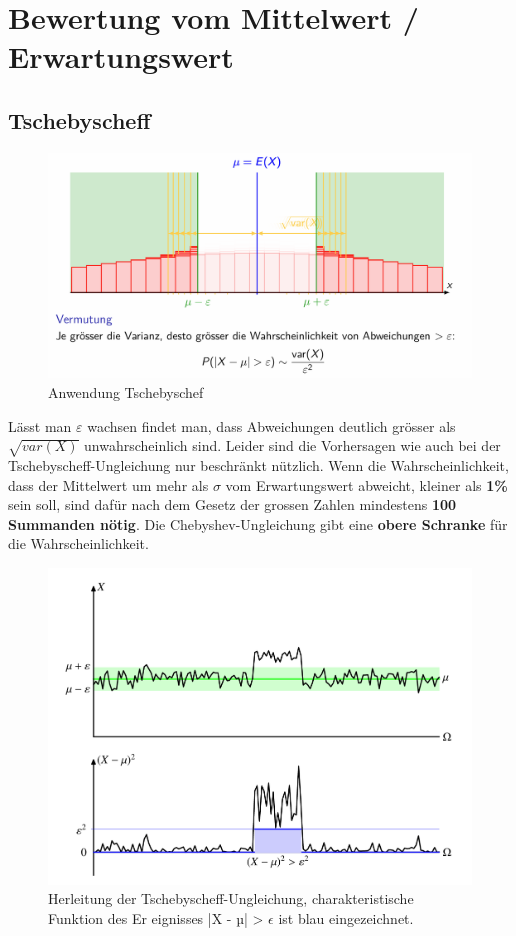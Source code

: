 \documentclass[../Main.tex]{subfiles}
\begin{document}
\section{Bewertung vom Mittelwert / Erwartungswert}

\subsection{Tschebyscheff}
\begin{figure}[H]
    \centering
    \includegraphics[width=0.75\linewidth]{Images/tschebyschef.png}
    \caption{Anwendung Tschebyschef}
\end{figure}

Lässt man \(\varepsilon\) wachsen findet man,
dass Abweichungen deutlich grösser als \(\sqrt{var(X)}\) unwahrscheinlich sind.  
Leider sind die Vorhersagen wie auch bei der
Tschebyscheff-Ungleichung nur beschränkt nützlich.
Wenn die Wahrscheinlichkeit, dass der Mittelwert um mehr
als \(\sigma\) vom Erwartungswert abweicht, kleiner als
\textbf{1\% } sein soll, sind dafür nach dem Gesetz der grossen Zahlen
mindestens \textbf{100 Summanden nötig}. 
Die Chebyshev-Ungleichung gibt eine \textbf{obere Schranke} für die Wahrscheinlichkeit.
\begin{figure}[H]
    \centering
    \includegraphics[width=0.75\linewidth]{Images/Tschebyscheff-Ungleichung.png}
    \caption{Herleitung der Tschebyscheff-Ungleichung, charakteristische Funktion des Er eignisses |X - µ| > \(\epsilon\) ist blau eingezeichnet. }
\end{figure}
\end{document}
